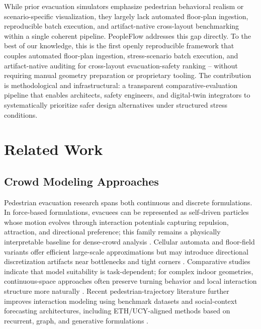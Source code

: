 \documentclass[nolineno]{ieeeaccess}
\begin{document}
While prior evacuation simulators emphasize pedestrian behavioral realism or scenario-specific visualization, they largely lack automated floor-plan ingestion, reproducible batch execution, and artifact-native cross-layout benchmarking within a single coherent pipeline. PeopleFlow addresses this gap directly. To the best of our knowledge, this is the first openly reproducible framework that couples automated floor-plan ingestion, stress-scenario batch execution, and artifact-native auditing for cross-layout evacuation-safety ranking -- without requiring manual geometry preparation or proprietary tooling. The contribution is methodological and infrastructural: a transparent comparative-evaluation pipeline that enables architects, safety engineers, and digital-twin integrators to systematically prioritize safer design alternatives under structured stress conditions.

\section{Related Work}
\subsection{Crowd Modeling Approaches}
Pedestrian evacuation research spans both continuous and discrete formulations. In force-based formulations, evacuees can be represented as self-driven particles whose motion evolves through interaction potentials capturing repulsion, attraction, and directional preference; this family remains a physically interpretable baseline for dense-crowd analysis \cite{sfm,helbing2000}. Cellular automata and floor-field variants offer efficient large-scale approximations but may introduce directional discretization artifacts near bottlenecks and tight corners \cite{ca,kirchner2002}. Comparative studies indicate that model suitability is task-dependent; for complex indoor geometries, continuous-space approaches often preserve turning behavior and local interaction structure more naturally \cite{zheng2009,duives2013,crowd_book}.
Recent pedestrian-trajectory literature further improves interaction modeling using benchmark datasets and social-context forecasting architectures, including ETH/UCY-aligned methods based on recurrent, graph, and generative formulations \cite{pellegrini2009eth,alahi2016sociallstm,gupta2018socialgan,salzmann2020trajectron,mohamed2020stgcnn,zhou2021astgnn,chen2021intention,li2020recurrent,wang2023timtraj,saleh2022transformer}.
\end{document}

